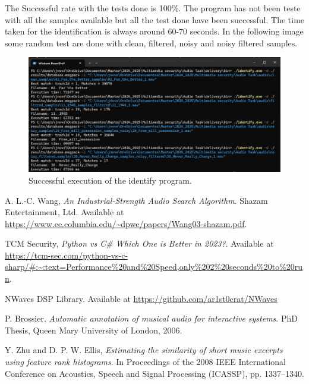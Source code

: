 \documentclass[11pt, a4paper]{article}
\begin{document}
    \vspace{1em} The Successful rate with the tests done is 100\%. The program has not been teste with all the samples available but all the test done have been successful. The time
    taken for the identification is always around 60-70 seconds. In the following image some random test are done with clean, filtered, noisy and noisy filtered samples.

    \begin{figure}[H]
        \centering
        \includegraphics[width=\textwidth]{media/identify_execution.png}
        \caption{Successful execution of the identify program.}
        \label{fig:identify_execution}
    \end{figure}

    \newpage

    \begin{thebibliography}{11}

    A. L.-C. Wang, \textit{An Industrial-Strength Audio Search Algorithm}.  
    Shazam Entertainment, Ltd.  
    Available at \url{https://www.ee.columbia.edu/~dpwe/papers/Wang03-shazam.pdf}.

    TCM Security, \textit{Python vs C\# \newline Which One is Better in 2023?}.  
    Available at \url{https://tcm-sec.com/python-vs-c-sharp/#:~:text=Performance%20and%20Speed,only%202%20seconds%20to%20run}.

    NWaves DSP Library. Available at \url{https://github.com/ar1st0crat/NWaves}

    P. Brossier, \textit{Automatic annotation of musical audio for interactive systems}. 
    PhD Thesis, Queen Mary University of London, 2006.

    Y. Zhu and D. P. W. Ellis, \textit{Estimating the similarity of short music excerpts using feature rank histograms}. 
    In Proceedings of the 2008 IEEE International Conference on Acoustics, Speech and Signal Processing (ICASSP), pp. 1337–1340.

\end{thebibliography}
\end{document}
